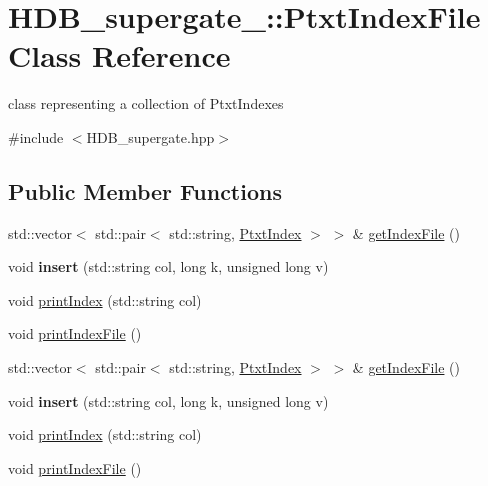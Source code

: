 \hypertarget{classHDB__supergate___1_1PtxtIndexFile}{}\section{H\+D\+B\+\_\+supergate\+\_\+\+:\+:Ptxt\+Index\+File Class Reference}
\label{classHDB__supergate___1_1PtxtIndexFile}


class representing a collection of Ptxt\+Indexes  




{\ttfamily \#include $<$H\+D\+B\+\_\+supergate.\+hpp$>$}

\subsection*{Public Member Functions}
\begin{DoxyCompactItemize}
\item 
std\+::vector$<$ std\+::pair$<$ std\+::string, \hyperlink{classHDB__supergate___1_1PtxtIndex}{Ptxt\+Index} $>$ $>$ \& \hyperlink{classHDB__supergate___1_1PtxtIndexFile_a8244f5f9995a99571e048cd0d5145245}{get\+Index\+File} ()
\item 
\mbox{\label{classHDB__supergate___1_1PtxtIndexFile_a479f0f9801773e79eb4423c838373471}} 
void {\bfseries insert} (std\+::string col, long k, unsigned long v)
\item 
void \hyperlink{classHDB__supergate___1_1PtxtIndexFile_a6c493079e987b2813891087a8e7ee128}{print\+Index} (std\+::string col)
\item 
void \hyperlink{classHDB__supergate___1_1PtxtIndexFile_ae67b7aec347663f4f47841f20788e2e6}{print\+Index\+File} ()
\item 
std\+::vector$<$ std\+::pair$<$ std\+::string, \hyperlink{classHDB__supergate___1_1PtxtIndex}{Ptxt\+Index} $>$ $>$ \& \hyperlink{classHDB__supergate___1_1PtxtIndexFile_a8244f5f9995a99571e048cd0d5145245}{get\+Index\+File} ()
\item 
\mbox{\label{classHDB__supergate___1_1PtxtIndexFile_a479f0f9801773e79eb4423c838373471}} 
void {\bfseries insert} (std\+::string col, long k, unsigned long v)
\item 
void \hyperlink{classHDB__supergate___1_1PtxtIndexFile_a6c493079e987b2813891087a8e7ee128}{print\+Index} (std\+::string col)
\item 
void \hyperlink{classHDB__supergate___1_1PtxtIndexFile_ae67b7aec347663f4f47841f20788e2e6}{print\+Index\+File} ()
\end{DoxyCompactItemize}


